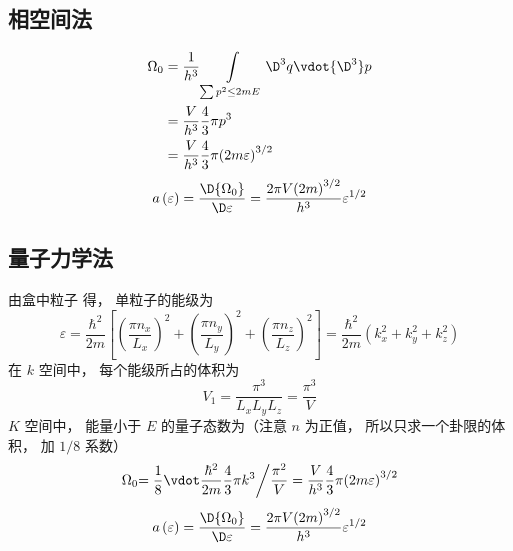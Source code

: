 
\subsection{相空间法}
\begin{equation}
    \begin{aligned}
    {\Omega _0} & = \frac{1}{{{h^3}}}\int\limits_{\sum {{p^2}}  \le 2mE} {{ \D ^3}q \vdot { \D ^3}p}  \\
    & = \frac{V}{{{h^3}}}\frac{4}{3}\pi {p^3} \\
    & = \frac{V}{{{h^3}}}\frac{4}{3}\pi {\left( {2m\varepsilon } \right)^{3/2}}
    \end{aligned}
  \end{equation}
  \begin{equation}
    a\left( \varepsilon  \right) = \frac{{ \D {\Omega _0}}}{{ \D \varepsilon }} = \frac{{2\pi V{{\left( {2m} \right)}^{3/2}}}}{{{h^3}}}{\varepsilon ^{1/2}}
  \end{equation}

\subsection{量子力学法}
由盒中粒子%
得， 单粒子的能级为
\begin{equation}
\varepsilon = \frac{{{\hbar ^2}}}{{2m}}\left[ {{{\left( {\frac{{\pi {n_x}}}{{{L_x}}}} \right)}^2} + {{\left( {\frac{{\pi {n_y}}}{{{L_y}}}} \right)}^2} + {{\left( {\frac{{\pi {n_z}}}{{{L_z}}}} \right)}^2}} \right] = \frac{{{\hbar ^2}}}{{2m}}\left( {k_x^2 + k_y^2 + k_z^2} \right)
\end{equation}
在 $k$ 空间中， 每个能级所占的体积为
\begin{equation}
{V_1} = \frac{{{\pi ^3}}}{{{L_x}{L_y}{L_z}}} = \frac{{{\pi ^3}}}{V}
\end{equation}
  $K$ 空间中， 能量小于 $E$ 的量子态数为（注意 $n$ 为正值， 所以只求一个卦限的体积， 加 $1/8$ 系数）
\begin{equation}
    {\Omega _0}{{ = \frac{1}{8} \vdot \frac{{{\hbar ^2}}}{{2m}}\frac{4}{3}\pi {k^3}} \mathord{\left/
 {\vphantom {{ = \frac{1}{8} \vdot \frac{{{\hbar ^2}}}{{2m}}\frac{4}{3}\pi {k^3}} {\frac{{{\pi ^2}}}{V}}}} \right.
 \kern-\nulldelimiterspace} {\frac{{{\pi ^2}}}{V}}} = \frac{V}{{{h^3}}}\frac{4}{3}\pi {\left( {2m\varepsilon } \right)^{3/2}}
\end{equation}
\begin{equation}
      a\left( \varepsilon  \right) = \frac{{ \D {\Omega _0}}}{{ \D \varepsilon }} = \frac{{2\pi V{{\left( {2m} \right)}^{3/2}}}}{{{h^3}}}{\varepsilon ^{1/2}}
\end{equation}

